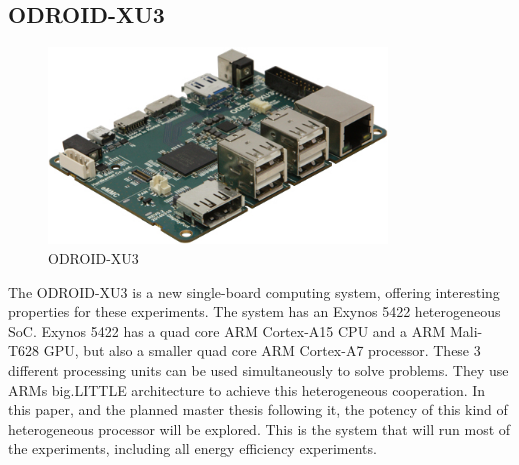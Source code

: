 \subsection{ODROID-XU3} \label{OdroidXU3}
\begin{figure}[H]
  \centering
  \includegraphics[width=90mm]{fig/ODROID.jpg}
  \caption{ODROID-XU3 \label{overflow}}
\end{figure}
The ODROID-XU3 is a new single-board computing system, offering interesting properties for these experiments.
The system has an Exynos 5422 heterogeneous SoC.
Exynos 5422 has a quad core ARM Cortex-A15 CPU and a ARM Mali-T628 GPU, but also a smaller quad core ARM Cortex-A7 processor.
These 3 different processing units can be used simultaneously to solve problems.
They use ARMs big.LITTLE architecture to achieve this heterogeneous cooperation.
In this paper, and the planned master thesis following it, the potency of this kind of heterogeneous processor will be explored.
This is the system that will run most of the experiments, including all energy efficiency experiments.

